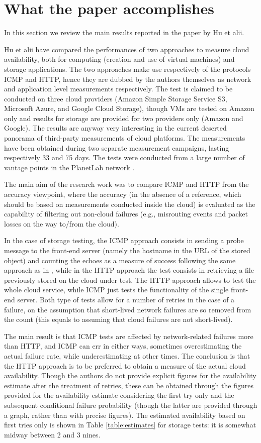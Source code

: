 \documentclass[runningheads,a4paper]{llncs}
\begin{document}
\section{What the paper accomplishes}
\label{results}
In this section we review the main results reported in the paper by Hu et alii.

Hu et alii have compared the performances of two approaches to measure cloud availability, both for computing (creation and use of virtual machines) and storage applications. The two approaches make use respectively of the protocols ICMP and HTTP, hence they are dubbed by the authors themselves as network and application level measurements respectively. The test is claimed to be conducted on three cloud providers (Amazon Simple Storage Service S3, Microsoft Azure, and Google Cloud Storage), though VMs are tested on Amazon only and results for storage are provided for two providers only (Amazon and Google). The results are anyway very interesting in the current deserted panorama of third-party measurements of cloud platforms. The measurements have been obtained during two separate measurement campaigns, lasting respectively 33 and 75 days. The tests were conducted from a large number of vantage points in the PlanetLab network \cite{chun2003planetlab}.

The main aim of the research work was to compare ICMP and HTTP from the accuracy viewpoint, where the accuracy (in the absence of a reference, which should be based on measurements conducted inside the cloud) is evaluated as the capability of filtering out non-cloud failures (e.g., misrouting events and packet losses on the way to/from the cloud). 

In the case of storage testing, the ICMP approach consists in sending a probe message to the front-end server (namely the hostname in the URL of the stored object) and counting the echoes as a measure of success following the same approach as in \cite{ford2010}, while in the HTTP approach the test consists in retrieving a file previously stored on the cloud under test. The HTTP approach allows to test the whole cloud service, while ICMP just tests the functionality of the single front-end server. Both type of tests allow for a number of retries in the case of a failure, on the assumption that short-lived network failures are so removed from the count (this equals to assuming that cloud failures are not short-lived).  

The main result is that ICMP tests are affected by network-related failures more than HTTP, and ICMP can err in either ways, sometimes overestimating the actual failure rate, while underestimating at other times. The conclusion is that the HTTP approach is to be preferred to obtain a measure of the actual cloud availability. Though the authors do not provide explicit figures for the availability estimate after the treatment of retries, these can be obtained through the figures provided for the availability estimate considering the first try only and the subsequent conditional failure probability (though the latter are provided through a graph, rather than with precise figures). The estimated availability based on first tries only is shown in Table \ref{table:estimates} for storage tests: it is somewhat midway between 2 and 3 nines.
\end{document}
